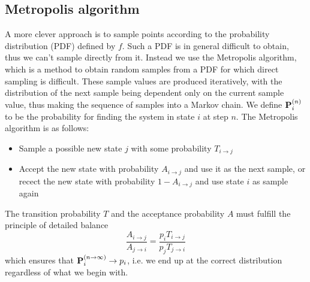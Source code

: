 \documentclass[english, a4paper]{article}
\begin{document}
\subsection{Metropolis algorithm}

A more clever approach is to sample points according to the probability distribution (PDF)
defined by $f$. Such a PDF is in general difficult to obtain, thus we can't sample directly from it.
Instead we use the Metropolis algorithm, which is a method to obtain random samples from a PDF for which 
direct sampling is difficult. 
These sample values are produced iteratively, with the distribution of the next sample being dependent only on 
the current sample value, thus making the sequence of samples into a Markov chain.
We define ${\bf P}_i^{(n)}$ to be the 
probability for finding the system in state $i$ at step $n$. 
The Metropolis algorithm is as follows:
\begin{itemize}
 \item Sample a possible new state $j$ with some probability $T_{i\rightarrow j}$
 \item Accept the new state with probability $A_{i\rightarrow j}$ and use it as the next sample, or
 recect the new state with probability $1 - A_{i\rightarrow j}$ and use state $i$ as sample again
\end{itemize}
The transition probability $T$ and the acceptance probability $A$ must fulfill the principle of detailed balance
\begin{equation}
 \frac{A_{i\rightarrow j}}{A_{j\rightarrow i}} = \frac{p_i T_{i\rightarrow j}}{p_j T_{j\rightarrow i}}
 \label{detailedbalance}
\end{equation}
which ensures that ${\bf P}_i^{(n\rightarrow \infty)} \rightarrow p_i$, i.e. we end up at the correct 
distribution regardless of what we begin with. \\
\end{document}

